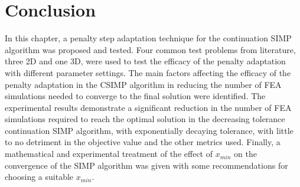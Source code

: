 \section{Conclusion} \label{sec:conclusion}

  In this chapter, a penalty step adaptation technique for the continuation SIMP algorithm was proposed and tested. Four common test problems from literature, three 2D and one 3D, were used to test the efficacy of the penalty adaptation with different parameter settings. The main factors affecting the efficacy of the penalty adaptation in the CSIMP algorithm in reducing the number of FEA simulations needed to converge to the final solution were identified. The experimental results demonstrate a significant reduction in the number of FEA simulations required to reach the optimal solution in the decreasing tolerance continuation SIMP algorithm, with exponentially decaying tolerance, with little to no detriment in the objective value and the other metrics used. Finally, a mathematical and experimental treatment of the effect of $x_{min}$ on the convergence of the SIMP algorithm was given with some recommendations for choosing a suitable $x_{min}$.


\clearpage
\newpage
